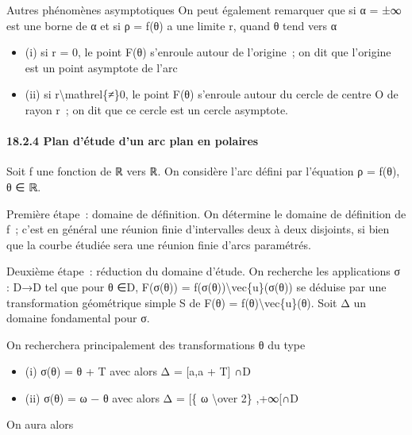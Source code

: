 \documentclass[]{article}
\begin{document}
Autres phénomènes asymptotiques On peut également remarquer que si α =
±∞ est une borne de α et si ρ = f(θ) a une limite r, quand θ tend vers α

\begin{itemize}
\itemsep1pt\parskip0pt
\item
  (i) si r = 0, le point F(θ) s'enroule autour de l'origine~; on dit que
  l'origine est un point asymptote de l'arc
\item
  (ii) si r\textbackslash{}mathrel\{≠\}0, le point F(θ) s'enroule autour
  du cercle de centre O de rayon \textbar{}r\textbar{}~; on dit que ce
  cercle est un cercle asymptote.
\end{itemize}

\paragraph{18.2.4 Plan d'étude d'un arc plan en polaires}

Soit f une fonction de ℝ vers ℝ. On considère l'arc défini par
l'équation ρ = f(θ), θ ∈ ℝ.

Première étape~: domaine de définition. On détermine le domaine de
définition de f~; c'est en général une réunion finie d'intervalles deux
à deux disjoints, si bien que la courbe étudiée sera une réunion finie
d'arcs paramétrés.

Deuxième étape~: réduction du domaine d'étude. On recherche les
applications σ : D→D tel que pour θ ∈D, F(σ(θ)) =
f(σ(θ))\textbackslash{}vec\{u\}(σ(θ)) se déduise par une transformation
géométrique simple S de F(θ) = f(θ)\textbackslash{}vec\{u\}(θ). Soit Δ
un domaine fondamental pour σ.

On recherchera principalement des transformations θ du type

\begin{itemize}
\itemsep1pt\parskip0pt
\item
  (i) σ(θ) = θ + T avec alors Δ = {[}a,a + T{]} ∩D
\item
  (ii) σ(θ) = ω − θ avec alors Δ = {[}\{ ω \textbackslash{}over 2\}
  ,+∞{[}∩D
\end{itemize}

On aura alors
\end{document}
